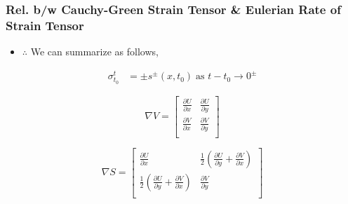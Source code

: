 \documentclass[../presentation.tex]{subfiles}
\begin{document}
\begin{frame}
  \frametitle{\small Rel. b/w Cauchy-Green Strain Tensor \& Eulerian Rate of Strain Tensor}

  \begin{itemize}
    \item \(\therefore\) We can summarize as follows,
  \end{itemize}
  \begin{equation}
    \begin{aligned}
      \sigma_{t_0}^t &= \pm s^\pm (x, t_0)\; \text{as } t - t_0 \rightarrow 0^\pm
    \end{aligned}
  \end{equation}
  
  \begin{equation}
    \nabla V = \begin{bmatrix}
      \frac{\partial U}{\partial x} & \frac{\partial U}{\partial y} \\[12pt]
      \frac{\partial V}{\partial x} & \frac{\partial V}{\partial y} \\
    \end{bmatrix}
  \end{equation}
  
  \begin{equation}
    \nabla S = \begin{bmatrix}
      \frac{\partial U}{\partial x} & \frac{1}{2} (\frac{\partial U}{\partial y} + \frac{\partial V}{\partial x}) \\[12pt]
      \frac{1}{2} (\frac{\partial U}{\partial y} + \frac{\partial V}{\partial x}) & \frac{\partial V}{\partial y} \\
    \end{bmatrix}
  \end{equation}
\end{frame}
\end{document}
